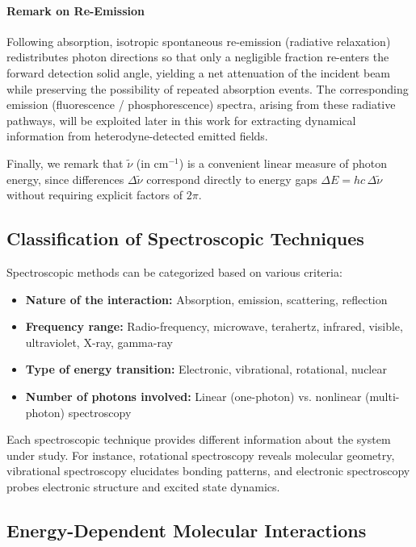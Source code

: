 \paragraph{Remark on Re-Emission}
\noindent Following absorption, isotropic spontaneous re-emission (radiative relaxation) redistributes photon directions so that only a negligible fraction re-enters the forward detection solid angle, yielding a net attenuation of the incident beam while preserving the possibility of repeated absorption events. The corresponding emission (fluorescence / phosphorescence) spectra, arising from these radiative pathways, will be exploited later in this work for extracting dynamical information from heterodyne-detected emitted fields.

\noindent Finally, we remark that $\tilde{\nu}$ (in cm$^{-1}$) is a convenient linear measure of photon energy, since differences $\Delta\tilde{\nu}$ correspond directly to energy gaps $\Delta E = h c\, \Delta\tilde{\nu}$ without requiring explicit factors of $2\pi$.


\subsection{Classification of Spectroscopic Techniques}
\label{subsec:spectroscopy_classification}

\noindent Spectroscopic methods can be categorized based on various criteria:

\begin{itemize}
	\item \textbf{Nature of the interaction:} Absorption, emission, scattering, reflection
	\item \textbf{Frequency range:} Radio-frequency, microwave, terahertz, infrared, visible, ultraviolet, X-ray, gamma-ray
	\item \textbf{Type of energy transition:} Electronic, vibrational, rotational, nuclear
	\item \textbf{Number of photons involved:} Linear (one-photon) vs. nonlinear (multi-photon) spectroscopy
\end{itemize}

\noindent Each spectroscopic technique provides different information about the system under study. For instance, rotational spectroscopy reveals molecular geometry, vibrational spectroscopy elucidates bonding patterns, and electronic spectroscopy probes electronic structure and excited state dynamics.

\subsection{Energy-Dependent Molecular Interactions}
\label{subsec:energy_dependent_interactions}

